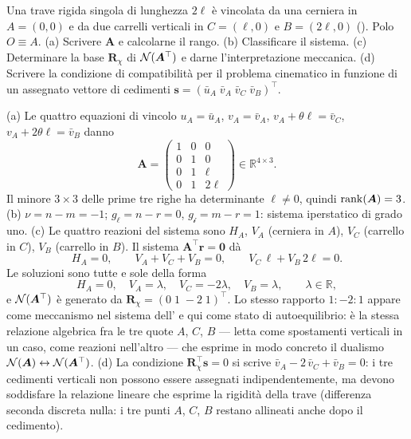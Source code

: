 \begin{esercizio}
	\label{ex:C05_trave_continua}
	
	Una trave rigida singola di lunghezza $2\ell$ è vincolata da una
	cerniera in $A=(0,0)$ e da due carrelli verticali in $C=(\ell,0)$
	e $B=(2\ell,0)$ (). Polo $O\equiv A$.
	(a) Scrivere $\bm{A}$ e calcolarne il rango.
	(b) Classificare il sistema. (c) Determinare la base
	$\bm{R}_\chi$ di $\mathcal{N}(\bm{A}^\top)$ e darne l'interpretazione
	meccanica. (d) Scrivere la condizione di compatibilità per il
	problema cinematico in funzione di un assegnato vettore di
	cedimenti $\bm{s}=(\bar{u}_A\;\bar{v}_A\;\bar{v}_C\;\bar{v}_B)^\top$.
	
	\risultato (a) Le quattro equazioni di vincolo
	$u_A=\bar{u}_A$, $v_A=\bar{v}_A$, $v_A+\theta\ell=\bar{v}_C$,
	$v_A+2\theta\ell=\bar{v}_B$ danno
	\[
	\bm{A}=
	\begin{pmatrix}
		1 & 0 & 0\\
		0 & 1 & 0\\
		0 & 1 & \ell\\
		0 & 1 & 2\ell
	\end{pmatrix}
	\in\mathbb{R}^{4\times 3}.
	\]
	Il minore $3\times 3$ delle prime tre righe ha determinante
	$\ell\neq 0$, quindi $\operatorname{rank}(\bm{A})=3$.
	(b) $\nu=n-m=-1$; $g_\ell=n-r=0$, $g_{\mathscr{i}}=m-r=1$:
	sistema iperstatico di grado uno.
	(c) Le quattro reazioni del sistema sono $H_A$, $V_A$ (cerniera
	in $A$), $V_C$ (carrello in $C$), $V_B$ (carrello in $B$). Il
	sistema $\bm{A}^\top\bm{r}=\bm{0}$ dà
	\[
	H_A = 0,
	\qquad V_A + V_C + V_B = 0,
	\qquad V_C\,\ell + V_B\,2\ell = 0.
	\]
	Le soluzioni sono tutte e sole della forma
	\[
	H_A = 0,
	\quad V_A = \lambda,
	\quad V_C = -2\lambda,
	\quad V_B = \lambda,
	\qquad \lambda\in\mathbb{R},
	\]
	e $\mathcal{N}(\bm{A}^\top)$ è generato da
	$\bm{R}_\chi=(0\;1\;-2\;1)^\top$. Lo stesso rapporto $1:-2:1$
	appare come meccanismo nel sistema
	dell' e qui come stato di
	autoequilibrio: è la stessa relazione algebrica fra le tre quote
	$A$, $C$, $B$ --- letta come spostamenti verticali in un caso,
	come reazioni nell'altro --- che esprime in modo concreto il
	dualismo $\mathcal{N}(\bm{A}) \leftrightarrow \mathcal{N}(\bm{A}^\top)$.
	(d) La condizione $\bm{R}_\chi^\top\bm{s}=0$ si scrive
	$\bar{v}_A - 2\,\bar{v}_C + \bar{v}_B = 0$: i tre cedimenti
	verticali non possono essere assegnati indipendentemente, ma
	devono soddisfare la relazione lineare che esprime la rigidità
	della trave (differenza seconda discreta nulla: i tre punti
	$A$, $C$, $B$ restano allineati anche dopo il cedimento).
\end{esercizio}